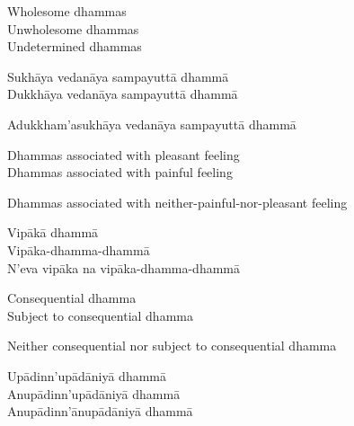\begin{english-verses}
  Wholesome dhammas\\
  Unwholesome dhammas\\
  Undetermined dhammas
\end{english-verses}

\begin{pali-hang-continued}
  Sukhāya vedanāya sampayuttā dhammā\\
  Dukkhāya vedanāya sampayuttā dhammā\\
  \begin{pali-hang-together}
  Adukkham'asukhāya vedanāya sampayuttā dhammā
  \end{pali-hang-together}
\end{pali-hang-continued}

\begin{english-verses}
  Dhammas associated with pleasant feeling\\
  Dhammas associated with painful feeling\\
  \begin{english-hang-together-verses}
  Dhammas associated with neither-painful-nor-pleasant feeling
  \end{english-hang-together-verses}
\end{english-verses}

\begin{pali-hang-continued}
  Vipākā dhammā\\
  Vipāka-dhamma-dhammā\\
  N'eva vipāka na vipāka-dhamma-dhammā
\end{pali-hang-continued}

\ifninebythirteen\clearpage\fi

\begin{english-verses}
  Consequential dhamma\\
  Subject to consequential dhamma\\
  \begin{english-hang-together-verses}
  Neither consequential nor subject to consequential dhamma
  \end{english-hang-together-verses}
\end{english-verses}

\ifbfive\clearpage\fi

\begin{pali-hang-continued}
  Upādinn'upādāniyā dhammā\\
  Anupādinn'upādāniyā dhammā\\
  Anupādinn'ānupādāniyā dhammā
\end{pali-hang-continued}


